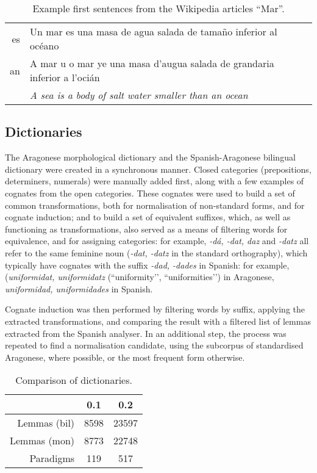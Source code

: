 \documentclass[10pt, a4paper]{article}
\begin{document}
  \begin{table}
  \begin{center}
  \caption{Example first sentences from the Wikipedia articles ``Mar''.\label{tab:comp}}
  \begin{tabular}{r p{5cm}}
     es & Un mar es una masa de agua salada de tamaño inferior al océano \\
     an & A mar u o mar ye una masa d'augua salada de grandaria inferior a l'ocián \\
        & {\em A sea is a body of salt water smaller than an ocean}\\
  \end{tabular}
  \end{center}
  \end{table}
  
  \subsection{Dictionaries}
  
  The Aragonese morphological dictionary and the Spanish-Aragonese bilingual dictionary were created in a synchronous manner. Closed categories (prepositions, determiners, numerals) were manually added first, along with a few examples of cognates from the open categories. These cognates were used to build a set of common transformations, both for normalisation of non-standard forms, and for cognate induction; and to build a set of equivalent suffixes, which, as well as functioning as transformations, also served as a means of filtering words for equivalence, and for assigning categories: for example, {\em -dá,  -dat, daz} and {\em -datz} all refer to the same feminine noun ({\em -dat, -datz} in the standard orthography), which typically have cognates with the suffix {\em -dad, -dades} in Spanish: for example, ({\em uniformidat, uniformidatz} (``uniformity’’, ``uniformities’’) in Aragonese, {\em uniformidad, uniformidades} in Spanish.

  Cognate induction was then performed by filtering words by suffix, applying the extracted transformations, and comparing the result with a filtered list of lemmas extracted from the Spanish analyser. In an additional step, the process was repeated to find a normalisation candidate, using the subcorpus of standardised Aragonese, where possible, or the most frequent form otherwise.
  
  \begin{table}
  \begin{center}
  \caption{Comparison of dictionaries.\label{tab:phases}}
  \begin{tabular}{|r|c|c|}
  \hline
    & 0.1 & 0.2 \\
  \hline
  Lemmas (bil) & 8598  & 23597 \\
  \hline
  Lemmas (mon) & 8773  & 22748\\
  Paradigms    & 119   & 517  \\
  \hline
  \end{tabular}
  \end{center}
  \end{table}
  
\end{document}
